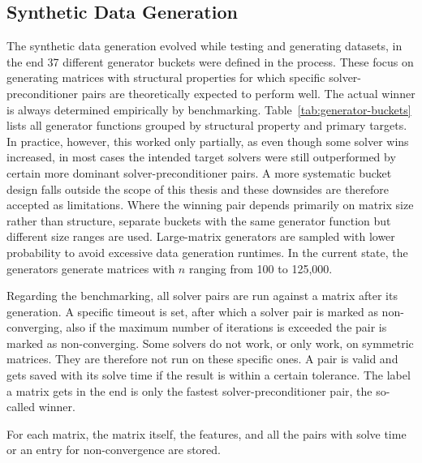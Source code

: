 \subsection{Synthetic Data Generation}\label{subsec:synthetic-datagen}

The synthetic data generation evolved while testing and generating datasets, in the end 37 different generator buckets
were defined in the process.
These focus on generating matrices with structural properties for which specific solver-preconditioner pairs are theoretically expected to perform well.
The actual winner is always determined empirically by benchmarking.
Table~\ref{tab:generator-buckets} lists all generator functions grouped by structural property and primary targets.
In practice, however, this worked only partially, as even though some solver wins increased, in most cases the intended target solvers were still
outperformed by certain more dominant solver-preconditioner pairs.
A more systematic bucket design falls outside the scope of this thesis and these downsides are therefore accepted as limitations.
Where the winning pair depends primarily on matrix size rather than structure, separate buckets with the same generator function but different size ranges are used.
Large-matrix generators are sampled with lower probability to avoid excessive data generation runtimes.
In the current state, the generators generate matrices with $n$ ranging from 100 to 125{,}000.

Regarding the benchmarking, all solver pairs are run against a matrix after its generation.
A specific timeout is set, after which a solver pair is marked as non-converging, also if the maximum number of iterations is exceeded
the pair is marked as non-converging.
Some solvers do not work, or only work, on symmetric matrices. They are therefore not run on these specific ones.
A pair is valid and gets saved with its solve time if the result is within a certain tolerance.
The label a matrix gets in the end is only the fastest solver-preconditioner pair, the so-called winner.

For each matrix, the matrix itself, the features, and all the pairs with solve time or an entry for non-convergence are stored.

